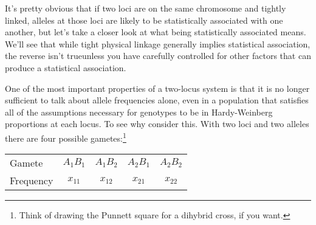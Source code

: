 \documentclass[12pt]{article}
\begin{document}
It's pretty obvious that if two loci are on the same chromosome and
tightly linked, alleles at those loci are likely to be statistically
associated with one another, but let's take a closer look at what
being statistically associated means. We'll see that while tight
physical linkage generally implies statistical association, the
reverse isn't true{\dash}unless you have carefully controlled for
other factors that can produce a statistical association.

One of the most important properties of a two-locus system is that it
is no longer sufficient to talk about allele frequencies alone, even
in a population that satisfies all of the assumptions necessary for
genotypes to be in Hardy-Weinberg proportions at each locus. To see
why consider this. With two loci and two alleles there are four
possible gametes:\footnote{Think of drawing the Punnett square for a
  dihybrid cross, if you want.}

\begin{center}
\begin{tabular}{lcccc}
Gamete    & $A_1B_1$ & $A_1B_2$ & $A_2B_1$ & $A_2B_2$ \\
Frequency & $x_{11}$ & $x_{12}$ & $x_{21}$ & $x_{22}$
\end{tabular}
\end{center}
\end{document}
